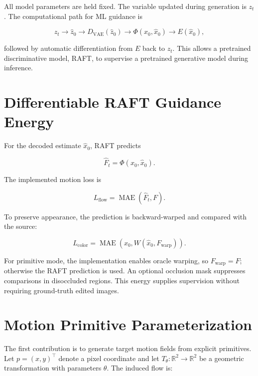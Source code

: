 All model parameters are held fixed. The variable updated during generation is $z_t$. The computational path for ML guidance is

\begin{equation}
z_t \rightarrow \hat{z}_0 \rightarrow D_{\mathrm{VAE}}(\hat{z}_0)
\rightarrow \Phi(x_0,\hat{x}_0) \rightarrow E(\hat{x}_0),
\label{eq:ml-computational-path}
\end{equation}

followed by automatic differentiation from $E$ back to $z_t$. This allows a pretrained discriminative model, RAFT, to supervise a pretrained generative model during inference.

\section{Differentiable RAFT Guidance Energy}

For the decoded estimate $\hat{x}_0$, RAFT predicts

\begin{equation}
\hat{F}_t=\Phi(x_0,\hat{x}_0).
\end{equation}

The implemented motion loss is

\begin{equation}
L_{\mathrm{flow}}=\operatorname{MAE}(\hat{F}_t,F).
\label{eq:implemented-flow-loss}
\end{equation}

To preserve appearance, the prediction is backward-warped and compared with the source:

\begin{equation}
L_{\mathrm{color}}=\operatorname{MAE}\left(x_0,W(\hat{x}_0,F_{\mathrm{warp}})\right).
\label{eq:implemented-color-loss}
\end{equation}

For primitive mode, the implementation enables oracle warping, so $F_{\mathrm{warp}}=F$; otherwise the RAFT prediction is used. An optional occlusion mask suppresses comparisons in disoccluded regions. This energy supplies supervision without requiring ground-truth edited images.

\section{Motion Primitive Parameterization}

The first contribution is to generate target motion fields from explicit primitives. Let $p=(x,y)^\top$ denote a pixel coordinate and let $T_\theta:\mathbb{R}^2 \rightarrow \mathbb{R}^2$ be a geometric transformation with parameters $\theta$. The induced flow is:

